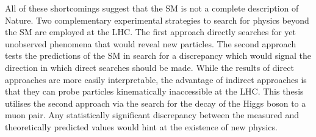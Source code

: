 All of these shortcomings suggest that the SM is not a complete description of Nature.
Two complementary experimental strategies to search for physics beyond the SM are
employed at the LHC. The first approach directly searches
for yet unobserved phenomena that would reveal new particles. The second approach tests
the predictions of the SM in search for a discrepancy which would signal the direction
in which direct searches should be made. While the results of direct approaches are
more easily interpretable, the advantage of indirect approaches is that they can probe
particles kinematically inaccessible at the LHC. This thesis utilises the second
approach via the search for the decay of the Higgs boson to a muon pair. Any
statistically significant discrepancy between the measured and theoretically predicted
values would hint at the existence of new physics.

